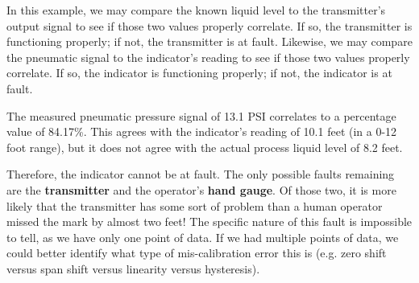 \vskip 10pt

In this example, we may compare the known liquid level to the transmitter's output signal to see if those two values properly correlate.  If so, the transmitter is functioning properly; if not, the transmitter is at fault.  Likewise, we may compare the pneumatic signal to the indicator's reading to see if those two values properly correlate.  If so, the indicator is functioning properly; if not, the indicator is at fault.

\vskip 10pt

The measured pneumatic pressure signal of 13.1 PSI correlates to a percentage value of 84.17\%.  This agrees with the indicator's reading of 10.1 feet (in a 0-12 foot range), but it does not agree with the actual process liquid level of 8.2 feet.

\vskip 10pt

Therefore, the indicator cannot be at fault.  The only possible faults remaining are the {\bf transmitter} and the operator's {\bf hand gauge}.  Of those two, it is more likely that the transmitter has some sort of problem than a human operator missed the mark by almost two feet!  The specific nature of this fault is impossible to tell, as we have only one point of data.  If we had multiple points of data, we could better identify what type of mis-calibration error this is (e.g. zero shift versus span shift versus linearity versus hysteresis).




